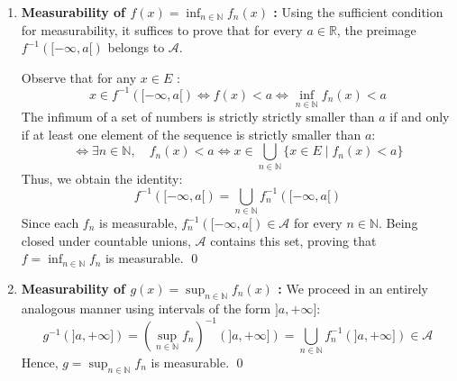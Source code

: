 \begin{enumerate}[label= \textbf{§}]
    \item \textbf{Measurability of $f(x) = \inf_{n \in \mathbb{N}} f_n(x)$ :}
    Using the sufficient condition for measurability, it suffices to prove that for every $a \in \mathbb{R}$, the preimage $f^{-1}([-\infty, a[)$ belongs to $\mathcal{A}$.
    
    Observe that for any $x \in E$ :
    \[
        x \in f^{-1}([-\infty, a[) \iff f(x) < a \iff \inf_{n \in \mathbb{N}} f_n(x) < a
    \]
    The infimum of a set of numbers is strictly strictly smaller than $a$ if and only if at least one element of the sequence is strictly smaller than $a$:
    \[
        \iff \exists n \in \mathbb{N}, \quad f_n(x) < a \iff x \in \bigcup_{n \in \mathbb{N}} \{ x \in E \mid f_n(x) < a \}
    \]
    Thus, we obtain the identity:
    \[
        f^{-1}([-\infty, a[) = \bigcup_{n \in \mathbb{N}} f_n^{-1}([-\infty, a[)
    \]
    Since each $f_n$ is measurable, $f_n^{-1}([-\infty, a[) \in \mathcal{A}$ for every $n \in \mathbb{N}$. Being closed under countable unions, $\mathcal{A}$ contains this set, proving that $f = \inf_{n \in \mathbb{N}} f_n$ is measurable. \qed

    \item \textbf{Measurability of $g(x) = \sup_{n \in \mathbb{N}} f_n(x)$ :}
    We proceed in an entirely analogous manner using intervals of the form $]a, +\infty]$:
    \[
        g^{-1}(]a, +\infty]) = \left( \sup_{n \in \mathbb{N}} f_n \right)^{-1}(]a, +\infty]) = \bigcup_{n \in \mathbb{N}} f_n^{-1}(]a, +\infty]) \in \mathcal{A}
    \]
    Hence, $g = \sup_{n \in \mathbb{N}} f_n$ is measurable. \qed
\end{enumerate}